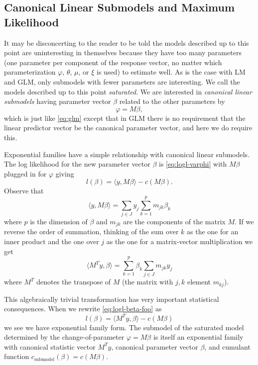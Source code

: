 \documentclass[11pt]{article}
\newcommand{\inner}[1]{\langle #1 \rangle}
\begin{document}
\subsection{Canonical Linear Submodels and Maximum Likelihood}
\label{sec:submodel}

It may be disconcerting to the reader to be told the models described
up to this point are uninteresting in themselves because they have too
many parameters (one parameter per component of the response vector,
no matter which parameterization $\varphi$, $\theta$, $\mu$, or $\xi$
is used) to estimate well.  As is the case with LM and GLM, only submodels
with fewer parameters are interesting.
We call the models described up to this point \emph{saturated}.
We are interested in \emph{canonical linear submodels} having parameter
vector $\beta$ related to the other parameters by
\begin{equation} \label{eq:canonical-linear-submodel}
   \varphi = M \beta,
\end{equation}
which is just like \eqref{eq:glm} except that in GLM there is no requirement
that the linear predictor vector be the canonical parameter vector, and here
we do require this.

Exponential families have a simple relationship
with canonical linear submodels.
The log likelihood for the new parameter vector $\beta$
is \eqref{eq:logl-varphi}
with $M \beta$ plugged in for $\varphi$ giving
\begin{equation} \label{eq:logl-beta-foo}
   l(\beta) = \inner{y, M \beta} - c(M \beta).
\end{equation}
Observe that
$$
   \inner{y, M \beta} = \sum_{j \in J} y_j \sum_{k = 1}^p m_{j k} \beta_k
$$
where $p$ is the dimension of $\beta$ and $m_{j k}$ are the components of
the matrix $M$.  If we reverse the order of summation, thinking of the sum
over $k$ as the one for an inner product and the one over $j$ as the one
for a matrix-vector multiplication we get
$$
   \inner{M^T y, \beta} = \sum_{k = 1}^p \beta_k \sum_{j \in J} m_{j k} y_j
$$
where $M^T$ denotes the transpose of $M$
(the matrix with $j, k$ element $m_{k j}$).

This algebraically trivial transformation has very important statistical
consequences.  When we rewrite \eqref{eq:logl-beta-foo} as
\begin{equation} \label{eq:logl-beta}
   l(\beta) = \inner{M^T y, \beta} - c(M \beta)
\end{equation}
we see we have exponential family form.  The submodel of the saturated model
determined by the change-of-parameter $\varphi = M \beta$ is itself an
exponential family with canonical statistic vector $M^T y$, canonical
parameter vector $\beta$,
and cumulant function $c_{\text{submodel}}(\beta) = c(M \beta)$.
\end{document}

